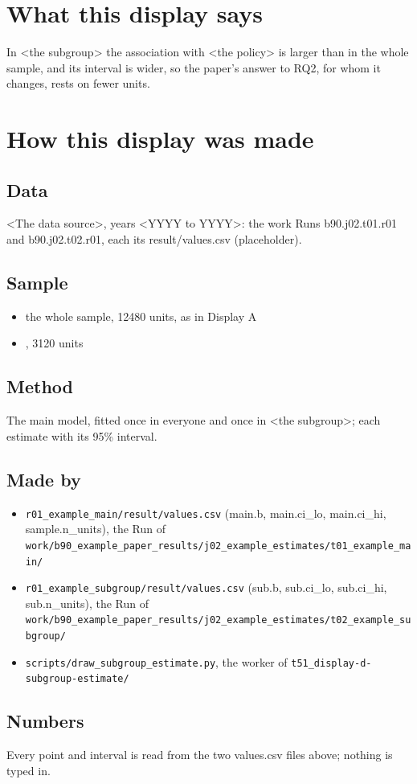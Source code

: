 \documentclass[12pt]{article}
\begin{document}
\makeatletter\renewcommand{\fps@figure}{H}\renewcommand{\fps@table}{H}\makeatother
\renewcommand{\figurename}{eFigure}\renewcommand{\tablename}{eTable}\renewcommand{\thefigure}{2}\renewcommand{\thetable}{2}

\clearpage
\section*{What this display says}
In <the subgroup> the association with <the policy> is larger than in the whole sample, and its interval is wider, so the paper's answer to RQ2, for whom it changes, rests on fewer units.

\section*{How this display was made}
\subsection*{Data}
<The data source>, years <YYYY to YYYY>: the work Runs b90.j02.t01.r01 and b90.j02.t02.r01, each its result/values.csv (placeholder).

\subsection*{Sample}
\begin{itemize}\item the whole sample, 12480 units, as in Display A
\item <the subgroup>, 3120 units
\end{itemize}
\subsection*{Method}
The main model, fitted once in everyone and once in <the subgroup>; each estimate with its 95\% interval.

\subsection*{Made by}
\begin{itemize}\item \texttt{r01\_example\_main/result/values.csv} (main.b, main.ci\_lo, main.ci\_hi, sample.n\_units), the Run of \texttt{work/b90\_example\_paper\_results/j02\_example\_estimates/t01\_example\_main/}
\item \texttt{r01\_example\_subgroup/result/values.csv} (sub.b, sub.ci\_lo, sub.ci\_hi, sub.n\_units), the Run of \texttt{work/b90\_example\_paper\_results/j02\_example\_estimates/t02\_example\_subgroup/}
\item \texttt{scripts/draw\_subgroup\_estimate.py}, the worker of \texttt{t51\_display-d-subgroup-estimate/}
\end{itemize}
\subsection*{Numbers}
Every point and interval is read from the two values.csv files above; nothing is typed in.
\end{document}

